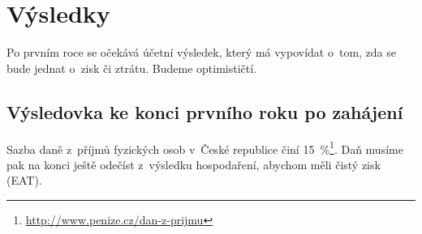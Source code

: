 \section{Výsledky}

Po prvním roce se očekává účetní výsledek, který má vypovídat o~tom, zda se bude jednat o~zisk či ztrátu. Budeme optimističtí.

\subsection{Výsledovka ke konci prvního roku po zahájení}
Sazba daně z~příjmů fyzických osob v~České republice činí 15~\%\footnote{\url{http://www.penize.cz/dan-z-prijmu}}. Daň musíme pak na konci ještě odečíst z~výsledku hospodaření, abychom měli čistý zisk (EAT).

